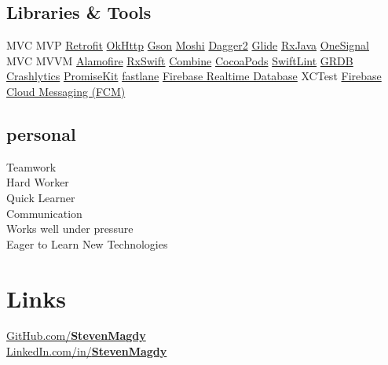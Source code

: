 \documentclass[]{Resume}
\begin{document}
\begin{minipage}[t]{0.33\textwidth}
\subsection{Libraries \& Tools}
MVC \textbullet{}
MVP \textbullet{}
\href{https://github.com/square/retrofit}{Retrofit} \textbullet{}
\href{https://github.com/square/okhttp}{OkHttp} \textbullet{}
\href{https://github.com/google/gson}{Gson} \textbullet{}
\href{https://github.com/square/moshi}{Moshi} \textbullet{}
\href{https://github.com/google/dagger}{Dagger2} \textbullet{}
\href{https://github.com/bumptech/glide}{Glide} \textbullet{}
\href{https://github.com/ReactiveX/RxJava}{RxJava} \textbullet{}
\href{https://onesignal.com/}{OneSignal}\\
\vspace{\topsep}
MVC \textbullet{} 
MVVM \textbullet{}
\href{https://github.com/Alamofire/Alamofire}{Alamofire} \textbullet{}
\href{https://github.com/ReactiveX/RxSwift}{RxSwift} \textbullet{}
\href{https://developer.apple.com/documentation/combine}{Combine} \textbullet{}
\href{https://cocoapods.org/}{CocoaPods} \textbullet{}
\href{https://github.com/realm/SwiftLint}{SwiftLint} \textbullet{}
\href{https://github.com/groue/GRDB.swift}{GRDB} \textbullet{}
\href{https://firebase.google.com/products/crashlytics}{Crashlytics} \textbullet{}
\href{https://github.com/mxcl/PromiseKit}{PromiseKit} \textbullet{}
\href{https://fastlane.tools}{fastlane} \textbullet{}
\href{https://firebase.google.com/products/realtime-database}{Firebase Realtime Database} \textbullet{}
XCTest \textbullet{}
\href{https://firebase.google.com/products/cloud-messaging}{Firebase Cloud Messaging (FCM)}
\sectionsep

\subsection{personal}
Teamwork\\
Hard Worker\\
Quick Learner\\
Communication\\
Works well under pressure\\
Eager to Learn New Technologies
\sectionsep


\section{Links} 
\href{https://github.com/stevenmagdy}{GitHub.com/\bf StevenMagdy}\\
\href{https://www.linkedin.com/in/StevenMagdy/}{LinkedIn.com/in/\bf StevenMagdy}

%
%

\end{minipage} 
\end{document}
